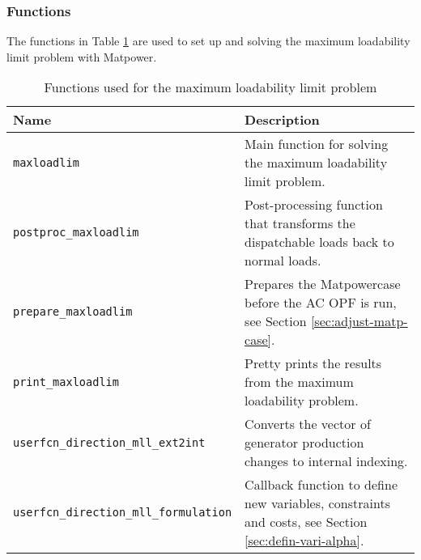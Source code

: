 \documentclass[12pt,a4]{article}
\newcommand*{\codemat}[1]{\texttt{#1}}
\newcommand*{\matpower}{{\sc Matpower}}
\begin{document}
\subsubsection{Functions}
\label{sec:functions}

The functions in Table \ref{tab:functions} are used to set up and solving the maximum loadability limit problem with \matpower.

\begin{table}[!h]
  \centering
  \begin{tabular}{lp{8cm}}
  \toprule
  Name  & Description \\
  \midrule
  \codemat{maxloadlim} & Main function for solving the maximum loadability limit problem.\\
  \codemat{postproc\_maxloadlim} & Post-processing function that transforms the dispatchable loads back to normal loads.\\
  \codemat{prepare\_maxloadlim} & Prepares the \matpower case before the AC OPF is run, see Section \ref{sec:adjust-matp-case}.\\
  \codemat{print\_maxloadlim} & Pretty prints the results from the maximum loadability problem.\\
  \codemat{userfcn\_direction\_mll\_ext2int} & Converts the vector of generator production changes to internal indexing.\\
  \codemat{userfcn\_direction\_mll\_formulation} & Callback function to define new variables, constraints and costs, see Section \ref{sec:defin-vari-alpha}. \\
  \bottomrule
  \end{tabular}
  \caption{Functions used for the maximum loadability limit problem}
  \label{tab:functions}
\end{table}
\end{document}
